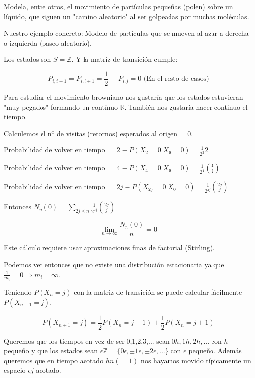\begin{center}
\end{center}

Modela, entre otros, el movimiento de partículas pequeñas (polen) sobre un líquido, que siguen un "camino aleatorio" al ser golpeadas por muchas moléculas.

Nuestro ejemplo concreto: Modelo de partículas que se mueven al azar a derecha o izquierda (paseo aleatorio).

Los estados son $S = \mathbb{Z}$. Y la matríz de transición cumple:


$$ P_{i,i-1} = P_{i, i+1} = \frac{1}{2} \;\;\;\;\; P_{i,j} = 0  \text{  (En el resto de casos)} $$


Para estudiar el movimiento browniano nos gustaría que los estados estuvieran "muy pegados" formando un contínuo $\mathbb{R}$. También nos gustaría hacer continuo el tiempo.


Calculemos el nº de visitas (retornos) esperados al origen = 0.

Probabilidad de volver en tiempo $ = 2 \equiv P(X_{2} = 0 | X_{0} = 0) = \frac{1}{2^2} 2 $

Probabilidad de volver en tiempo $ = 4 \equiv P(X_{4} = 0 | X_{0} = 0) = \frac{1}{2^4} \binom{4}{2} $

Probabilidad de volver en tiempo $ = 2j \equiv P(X_{2j} = 0 | X_{0} = 0) = \frac{1}{2^{2j}} \binom{2j}{j} $


Entonces $ N_{n} (0) = \sum\limits_{2j \leq n} \frac{1}{2^{2j}} \binom{2j}{j} $

$$ \lim_{n \rightarrow \infty} \frac{N_{n}(0)}{n} = 0 $$

Este cálculo requiere usar aproximaciones finas de factorial (Stirling).

Podemos ver entonces que no existe una distribución estacionaria ya que $\frac{1}{m_i} = 0 \Rightarrow m_i = \infty$.



Teniendo $P(X_{n} = j)$ con la matriz de transición se puede calcular fácilmente $P(X_{n+1} = j)$.

$$ P(X_{n+1} = j) = \frac{1}{2} P(X_{n} = j-1) + \frac{1}{2} P(X_{n} = j+1) $$


Queremos que los tiempos en vez de ser 0,1,2,3,... sean $0h, 1h, 2h, ...$ con $h$ pequeño y que los estados sean $\epsilon \mathbb{Z} = \{ 0\epsilon, \pm 1\epsilon, \pm 2\epsilon, ... \}$ con $\epsilon$ pequeño. Además queremos que en tiempo acotado $hn (=1)$ nos hayamos movido típicamente un espacio $\epsilon j$ acotado.

